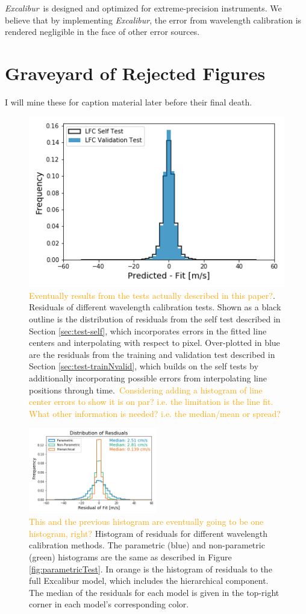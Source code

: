\documentclass[twocolumn]{aastex63}
\newcommand{\lz}[1]{\textcolor{orange}{#1}}
\newcommand{\project}[1]{\textsl{#1}}
\newcommand{\name}{\project{Excalibur}}
\begin{document}
\name\ is designed and optimized for extreme-precision instruments.  We believe that by implementing \name, the error from wavelength calibration is rendered negligible in the face of other error sources.




\pagebreak
\section{Graveyard of Rejected Figures}
I will mine these for caption material later before their final death.

\begin{figure}[h]
\centering
\includegraphics[width=.5\textwidth]{Figures/lfcgood.png}
\caption{\lz{Eventually results from the tests actually described in this paper?}.  Residuals of different wavelength calibration tests.  Shown as a black outline is the distribution of residuals from the self test described in Section \ref{sec:test-self}, which incorporates errors in the fitted line centers and interpolating with respect to pixel.  Over-plotted in blue are the residuals from the training and validation test described in Section \ref{sec:test-trainNvalid}, which builds on the self tests by additionally incorporating possible errors from interpolating line positions through time.\
\lz{Considering adding a histogram of line center errors to show it is on par?  i.e. the limitation is the line fit.  What other information is needed?  i.e. the median/mean or spread?}}
\label{fig:testHists}
\end{figure} 

\begin{figure}[h]
\centering
\includegraphics[width=0.5\textwidth]{Figures/allHists.png}
\caption{\lz{This and the previous histogram are eventually going to be one histogram, right?} Histogram of residuals for different wavelength calibration methods.  The parametric (blue) and non-parametric (green) histograms are the same as described in Figure \ref{fig:parametricTest}.  In orange is the histogram of residuals to the full Excalibur model, which includes the hierarchical component.  The median of the residuals for each model is given in the top-right corner in each model's corresponding color.}
\label{fig:allHists}
\end{figure} 
\end{document}
